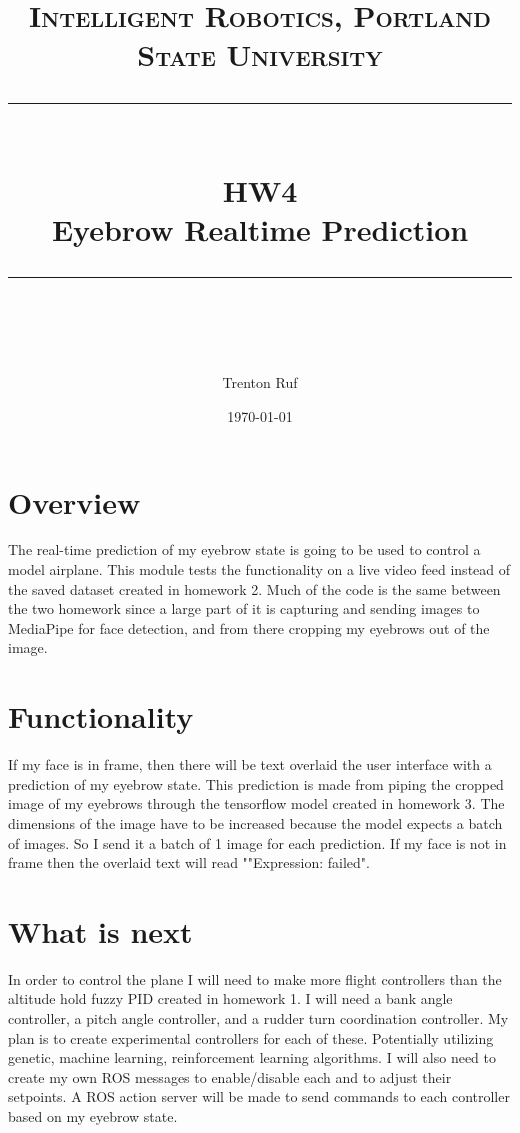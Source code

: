 \documentclass[11pt]{scrartcl} %
\title{	
	\normalfont\normalsize
	\textsc{Intelligent Robotics, Portland State University}\\ %
	\vspace{25pt} %
	\rule{\linewidth}{0.5pt}\\ %
	\vspace{20pt} %
	{\huge HW4}\\ %
	\vspace{4pt} %
	{\large Eyebrow Realtime Prediction}\\ %
	\vspace{12pt} %
	\rule{\linewidth}{2pt}\\ %
	\vspace{12pt} %
}
\author{\LARGE Trenton Ruf} %
\date{\normalsize \today} %
\begin{document}
\maketitle %




\renewcommand\thesubsection{\Roman{subsection}}
\section{Overview}
The real-time prediction of my eyebrow state is going to be used to control a model airplane.
This module tests the functionality on a live video feed instead of the saved dataset created in homework 2.
Much of the code is the same between the two homework since a large part of it is capturing and sending images to MediaPipe for face detection, 
and from there cropping my eyebrows out of the image.

\section{Functionality}
If my face is in frame, then there will be text overlaid the user interface with a prediction of my eyebrow state. 
This prediction is made from piping the cropped image of my eyebrows through the tensorflow model created in homework 3. 
The dimensions of the image have to be increased because the model expects a batch of images.
So I send it a batch of 1 image for each prediction.
If my face is not in frame then the overlaid text will read ""Expression: failed".


\section{What is next}
In order to control the plane I will need to make more flight controllers than the altitude hold fuzzy PID created in homework 1.
I will need a bank angle controller, a pitch angle controller, and a rudder turn coordination controller. 
My plan is to create experimental controllers for each of these. 
Potentially utilizing genetic, machine learning, reinforcement learning algorithms. 
I will also need to create my own ROS messages to enable/disable each and to adjust their setpoints. 
A ROS action server will be made to send commands to each controller based on my eyebrow state.
\end{document}
